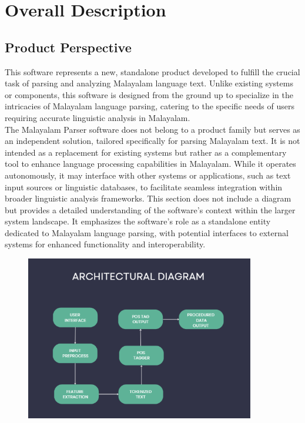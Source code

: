 \documentclass[12pt]{article}
\begin{document}
	\section{Overall Description}
	
	\subsection{Product Perspective}
	This software represents a new, standalone product
	developed to fulfill the crucial task of parsing and analyzing Malayalam language text.
	Unlike existing systems or components, this software is designed from the ground up to
	specialize in the intricacies of Malayalam language parsing, catering to the specific needs
	of users requiring accurate linguistic analysis in Malayalam.\\
	The Malayalam Parser software does not belong to a product family but serves as an
	independent solution, tailored specifically for parsing Malayalam text. It is not intended as
	a replacement for existing systems but rather as a complementary tool to enhance
	language processing capabilities in Malayalam. While it operates autonomously, it may
	interface with other systems or applications, such as text input sources or linguistic
	databases, to facilitate seamless integration within broader linguistic analysis frameworks.
	This section does not include a diagram but provides a detailed understanding of the
	software's context within the larger system landscape. It emphasizes the software's role as a standalone entity dedicated to Malayalam language parsing, with potential interfaces to
	external systems for enhanced functionality and interoperability.
	
	\begin{figure}[t]
		\centering
		\includegraphics[width=10cm]{architecture.png}
		\bigskip
	\end{figure}
	
\end{document}

